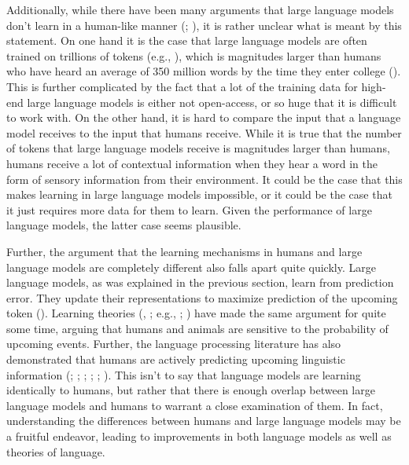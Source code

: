 \documentclass[
  12pt,
  letterpaper,
]{scrreport}
\begin{document}
Additionally, while there have been many arguments that large language
models don't learn in a human-like manner
(;
), it
is rather unclear what is meant by this statement. On one hand it is the
case that large language models are often trained on trillions of tokens
(e.g., ), which is magnitudes larger than humans who have heard an
average of 350 million words by the time they enter college
(). This is further complicated by the fact that a lot of the
training data for high-end large language models is either not
open-access, or so huge that it is difficult to work with. On the other
hand, it is hard to compare the input that a language model receives to
the input that humans receive. While it is true that the number of
tokens that large language models receive is magnitudes larger than
humans, humans receive a lot of contextual information when they hear a
word in the form of sensory information from their environment. It could
be the case that this makes learning in large language models
impossible, or it could be the case that it just requires more data for
them to learn. Given the performance of large language models, the
latter case seems plausible.

Further, the argument that the learning mechanisms in humans and large
language models are completely different also falls apart quite quickly.
Large language models, as was explained in the previous section, learn
from prediction error. They update their representations to maximize
prediction of the upcoming token
().
Learning theories (,
; e.g.,
;
)
have made the same argument for quite some time, arguing that humans and
animals are sensitive to the probability of upcoming events. Further,
the language processing literature has also demonstrated that humans are
actively predicting upcoming linguistic information
(;
;
; ;
;
). This isn't to say that language models are learning identically
to humans, but rather that there is enough overlap between large
language models and humans to warrant a close examination of them. In
fact, understanding the differences between humans and large language
models may be a fruitful endeavor, leading to improvements in both
language models as well as theories of language.
\end{document}
